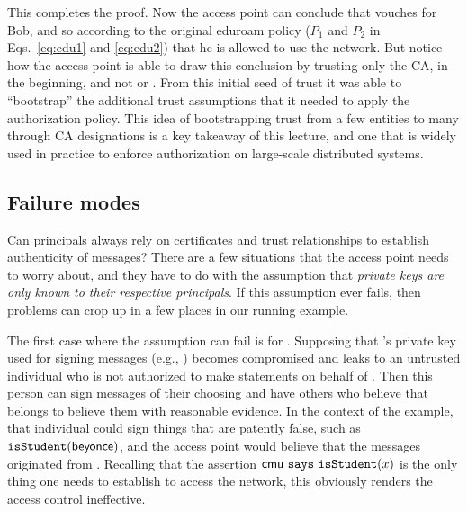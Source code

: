 \documentclass[11pt,twoside]{scrartcl}
\begin{document}
This completes the proof. Now the access point can conclude that \cmu vouches for Bob, and so according to the original eduroam policy ($P_1$ and $P_2$ in Eqs.~\ref{eq:edu1} and \ref{eq:edu2}) that he is allowed to use the network. But notice how the access point is able to draw this conclusion by trusting only the CA, \eduroam in the beginning, and not \cmu or \tli. From this initial seed of trust it was able to ``bootstrap'' the additional trust assumptions that it needed to apply the authorization policy. This idea of bootstrapping trust from a few entities to many through CA designations is a key takeaway of this lecture, and one that is widely used in practice to enforce authorization on large-scale distributed systems.

\subsection{Failure modes} 

Can principals always rely on certificates and trust relationships to establish authenticity of messages? There are a few situations that the access point needs to worry about, and they have to do with the assumption that \emph{private keys are only known to their respective principals}. If this assumption ever fails, then problems can crop up in a few places in our running example.

The first case where the assumption can fail is for \cmu. Supposing that \cmu's private key used for signing messages (e.g., \sign{\sk{\cmu}}{\isstu(\tli)}) becomes compromised and leaks to an untrusted individual who is not authorized to make statements on behalf of \cmu. Then this person can sign messages of their choosing and have others who believe that \pk{\cmu} belongs to \cmu believe them with reasonable evidence. In the context of the example, that individual could sign things that are patently false, such as $\texttt{\upshape isStudent}(\mathsf{beyonce})$, and the access point would believe that the messages originated from \cmu. Recalling that the assertion $\mathsf{cmu}~\texttt{\upshape says}~\texttt{\upshape isStudent}(x)$ is the only thing one needs to establish to access the network, this obviously renders the access control ineffective.
\end{document}
